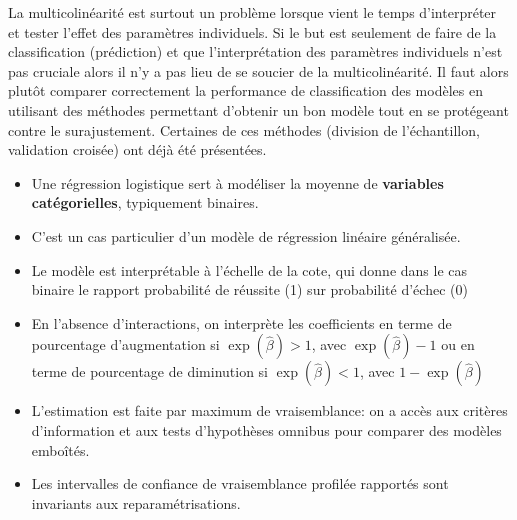 \documentclass[
  11pt,
  letterpaper,
]{scrbook}
\providecommand{\tightlist}{%
  \setlength{\itemsep}{0pt}\setlength{\parskip}{0pt}}\usepackage{longtable,booktabs,array}
\theoremstyle{definition}
\theoremstyle{remark}
\begin{document}
La multicolinéarité est surtout un problème lorsque vient le temps
d'interpréter et tester l'effet des paramètres individuels. Si le but
est seulement de faire de la classification (prédiction) et que
l'interprétation des paramètres individuels n'est pas cruciale alors il
n'y a pas lieu de se soucier de la multicolinéarité. Il faut alors
plutôt comparer correctement la performance de classification des
modèles en utilisant des méthodes permettant d'obtenir un bon modèle
tout en se protégeant contre le surajustement. Certaines de ces méthodes
(division de l'échantillon, validation croisée) ont déjà été présentées.

\begin{tcolorbox}[enhanced jigsaw, coltitle=black, left=2mm, opacitybacktitle=0.6, colback=white, leftrule=.75mm, colframe=quarto-callout-note-color-frame, toprule=.15mm, colbacktitle=quarto-callout-note-color!10!white, opacityback=0, bottomtitle=1mm, toptitle=1mm, rightrule=.15mm, title=\textcolor{quarto-callout-note-color}{\faInfo}\hspace{0.5em}{En résumé}, breakable, titlerule=0mm, arc=.35mm, bottomrule=.15mm]

\begin{itemize}
\tightlist
\item
  Une régression logistique sert à modéliser la moyenne de
  \textbf{variables catégorielles}, typiquement binaires.
\item
  C'est un cas particulier d'un modèle de régression linéaire
  généralisée.
\item
  Le modèle est interprétable à l'échelle de la cote, qui donne dans le
  cas binaire le rapport probabilité de réussite (1) sur probabilité
  d'échec (0)
\item
  En l'absence d'interactions, on interprète les coefficients en terme
  de pourcentage d'augmentation si \(\exp(\widehat{\beta}) > 1\), avec
  \(\exp(\widehat{\beta})-1\) ou en terme de pourcentage de diminution
  si \(\exp(\widehat{\beta}) < 1\), avec \(1-\exp(\widehat{\beta})\)
\item
  L'estimation est faite par maximum de vraisemblance: on a accès aux
  critères d'information et aux tests d'hypothèses omnibus pour comparer
  des modèles emboîtés.
\item
  Les intervalles de confiance de vraisemblance profilée rapportés sont
  invariants aux reparamétrisations.
\end{itemize}

\end{tcolorbox}
\end{document}
